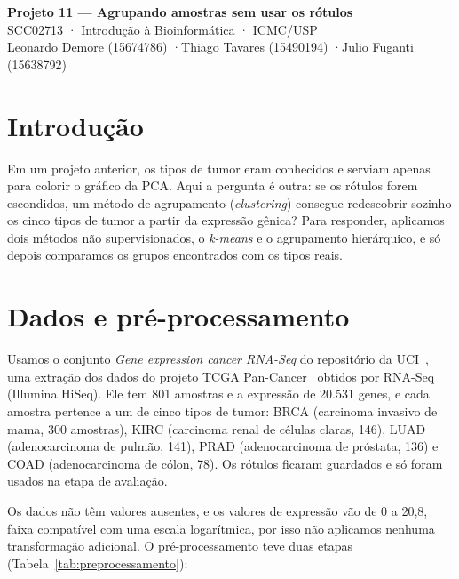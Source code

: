 \documentclass[11pt,a4paper]{article}
\begin{document}
\begin{center}
  {\Large\bfseries Projeto 11 --- Agrupando amostras sem usar os rótulos}\\[2pt]
  {\small SCC02713 · Introdução à Bioinformática · ICMC/USP}\\[2pt]
  {\small Leonardo Demore (15674786) \quad·\quad Thiago Tavares (15490194) \quad·\quad Julio Fuganti (15638792)}
\end{center}
\vspace{-4pt}

\section{Introdução}

Em um projeto anterior, os tipos de tumor eram conhecidos e serviam apenas para colorir o gráfico da PCA.
Aqui a pergunta é outra: se os rótulos forem escondidos, um método de agrupamento (\emph{clustering})
consegue redescobrir sozinho os cinco tipos de tumor a partir da expressão gênica?
Para responder, aplicamos dois métodos não supervisionados, o \emph{k-means} e o agrupamento hierárquico,
e só depois comparamos os grupos encontrados com os tipos reais.

\section{Dados e pré-processamento}

Usamos o conjunto \emph{Gene expression cancer RNA-Seq} do repositório da UCI~\cite{uci}, uma extração
dos dados do projeto TCGA Pan-Cancer~\cite{tcga} obtidos por RNA-Seq (Illumina HiSeq). Ele tem
801 amostras e a expressão de 20.531 genes, e cada amostra pertence a um de cinco tipos de tumor:
BRCA (carcinoma invasivo de mama, 300 amostras), KIRC (carcinoma renal de células claras, 146),
LUAD (adenocarcinoma de pulmão, 141), PRAD (adenocarcinoma de próstata, 136) e COAD
(adenocarcinoma de cólon, 78). Os rótulos ficaram guardados e só foram usados na etapa de avaliação.

Os dados não têm valores ausentes, e os valores de expressão vão de 0 a 20,8, faixa compatível com
uma escala logarítmica, por isso não aplicamos nenhuma transformação adicional. O pré-processamento
teve duas etapas (Tabela~\ref{tab:preprocessamento}):
\end{document}
